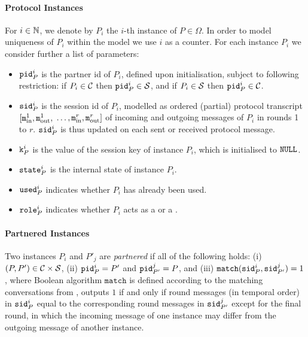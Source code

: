 \paragraph{Protocol Instances}
For $i\in\mathbb{N}$, we denote by $P_i$ the $i$-th instance of $P\in\Omega$.
In order to model uniqueness of $P_i$ within the model we use $i$ as a counter. For each instance $P_i$ we consider further a list of parameters:
\begin{itemize}
    \item $\mathtt{pid}^i_P$ is the partner id of $P_i$, defined upon initialisation, subject to following restriction: if $P_i\in\mathcal{C}$ then $\mathtt{pid}^i_P\in\mathcal{S}$, and if $P_i\in\mathcal{S}$ then $\mathtt{pid}^i_P\in\mathcal{C}$.
    \item $\mathtt{sid}^i_P$ is the session id of $P_i$, modelled as ordered (partial) protocol transcript $[\mathtt{m}_{\mathrm{in}}^1,\mathtt{m}_{\mathrm{out}}^1,$ $\ldots, \mathtt{m}_{\mathrm{in}}^r,\mathtt{m}_{\mathrm{out}}^r]$ of incoming and outgoing messages of $P_i$ in rounds 1 to $r$.
    	$\mathtt{sid}^i_P$ is thus updated on each sent or received protocol message.
    \item $\mathtt{k}^i_P$ is the value of the session key of instance $P_i$, which is initialised to $\mathtt{NULL}$.
    \item $\mathtt{state}^i_P$ is the internal state of instance $P_i$.
    \item $\mathtt{used}^i_P$ indicates whether $P_i$ has already been used.
    \item $\mathtt{role}^i_P$ indicates whether $P_i$ acts as a \client or a \server.
\end{itemize}

\paragraph{Partnered Instances}
Two instances $P_i$ and $P'_j$ are \emph{partnered} if all of the following holds:
(i) $(P,P')\in\mathcal{C}\times\mathcal{S}$, (ii) $\mathtt{pid}^i_P=P'$ and $\mathtt{pid}^j_{P'}=P$, and (iii) $\mathtt{match}(\mathtt{sid}^i_P, \mathtt{sid}^j_{P'})=1$, where Boolean algorithm $\mathtt{match}$ is defined according to the matching conversations from \cite{Bellare1993}, \ie outputs $1$ if and only if round messages (in temporal order) in $\mathtt{sid}^i_P$ equal to the corresponding round messages in $\mathtt{sid}^j_{P'}$ except for the final round, in which the incoming message of one instance may differ from the outgoing message of another instance.


